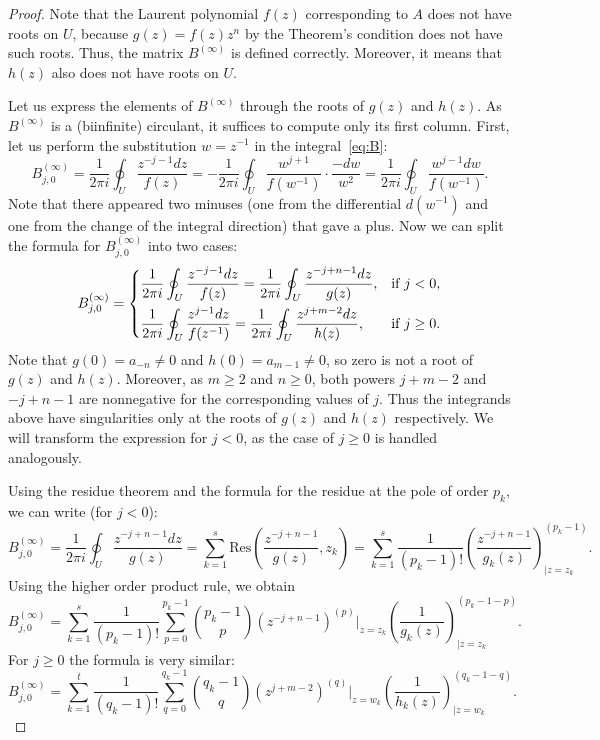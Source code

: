 \documentclass[a4paper]{article}
\newcommand{\Binf}{B^{(\infty)}}
\begin{document}
	\begin{proof}
	Note that the Laurent polynomial $f(z)$ corresponding to $A$ does not have roots on $U$, because $g(z) = f(z)z^n$ by the Theorem's condition does not have such roots.
	Thus, the matrix $\Binf$ is defined correctly.
	Moreover, it means that $h(z)$ also does not have roots on $U$.
	
	Let us express the elements of $\Binf$ through the roots of $g(z)$ and $h(z)$.
	As $\Binf$ is a (biinfinite) circulant, it suffices to compute only its first column.
	First, let us perform the substitution $w = z^{-1}$ in the integral~\eqref{eq:B}:
	\[
	\Binf_{j,0}
	=
	\frac{1}{2\pi i} \oint_U \frac{z^{-j-1}dz}{f(z)}
	=
	-\frac{1}{2\pi i} \oint_U \frac{w^{j+1}}{f(w^{-1})}\cdot\frac{-dw}{w^2}
	=
	\frac{1}{2\pi i} \oint_U \frac{w^{j-1}dw}{f(w^{-1})}.
	\]
	Note that there appeared two minuses (one from the differential $d(w^{-1})$ and one from the change of the integral direction)  that gave a plus.
	Now we can split the formula for $\Binf_{j,0}$ into two cases:
	\[
	\Binf_{j,0} =
	\begin{dcases}
	\frac{1}{2\pi i} \oint_U\frac{z^{-j-1}dz}{f(z)}
	=
	\frac{1}{2\pi i} \oint_U\frac{z^{-j+n-1}dz}{g(z)}, & \text{if }j < 0, \\
	\frac{1}{2\pi i} \oint_U\frac{z^{j-1}dz}{f(z^{-1})}
	=
	\frac{1}{2\pi i} \oint_U\frac{z^{j+m-2}dz}{h(z)},  & \text{if } j \ge 0.
	\end{dcases}
	\]
	Note that $g(0) = a_{-n} \neq 0$ and $h(0) = a_{m-1} \neq 0$, so zero is not a root of $g(z)$ and $h(z)$.
	Moreover, as $m \ge 2$ and $n \ge 0$, both powers $j + m - 2$ and $-j + n - 1$ are nonnegative for the corresponding values of $j$.
	Thus the integrands above have singularities only at the roots of $g(z)$ and $h(z)$ respectively.
	We will transform the expression for $j < 0$, as the case of $j \ge 0$ is handled analogously.
	
	Using the residue theorem and the formula for the residue at the pole of order $p_k$, we can write (for $j < 0$):
	\[
	\Binf_{j,0} =
	\frac{1}{2\pi i} \oint_U\frac{z^{-j+n-1}dz}{g(z)} = \sum_{k=1}^s \mathrm{Res}\left(\frac{z^{-j+n-1}}{g(z)}, z_k\right) 
	=
	\sum_{k=1}^s\frac{1}{(p_k - 1)!}\left(\frac{z^{-j+n-1}}{g_k(z)}\right)^{(p_k-1)}_{\big|{z=z_k}}.
	\]
	Using the  higher order product rule, we obtain
	\[
	\Binf_{j,0}
	=
	\sum_{k=1}^s\frac{1}{(p_k - 1)!}\sum_{p=0}^{p_k-1}\binom{p_k-1}{p}
	(z^{-j+n-1})^{(p)}|_{z=z_k} \left(\frac{1}{g_k(z)}\right)^{(p_k-1-p)}_{\big|{z=z_k}}.
	\]
	For $j \ge 0$ the formula is very similar:
	\[
	\Binf_{j,0}
	=
	\sum_{k=1}^t\frac{1}{(q_k - 1)!}\sum_{q=0}^{q_k-1}\binom{q_k-1}{q}
	(z^{j+m-2})^{(q)}|_{z=w_k} \left(\frac{1}{h_k(z)}\right)^{(q_k-1-q)}_{\big|{z=w_k}}.
	\]
	

\end{proof}
\end{document}
